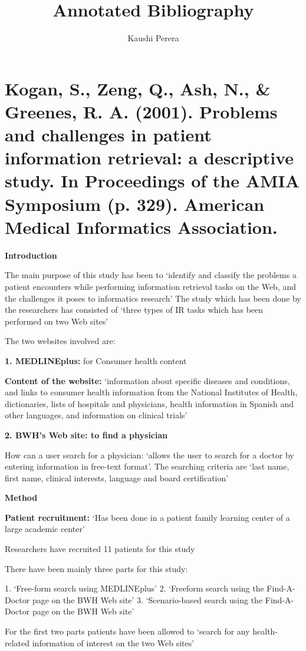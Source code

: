 \documentclass[]{article}
\title{Annotated Bibliography}
\author{Kaushi Perera}
\begin{document}
\maketitle


\section{Kogan, S., Zeng, Q., Ash, N., \& Greenes, R. A. (2001). Problems and challenges in patient information retrieval: a descriptive study. In Proceedings of the AMIA Symposium (p. 329). American Medical Informatics Association.}

\textbf{Introduction}

The main purpose of this study has been to ‘identify and classify the problems a patient encounters while performing information retrieval tasks on the Web, and the challenges it poses to informatics research’
The study which has been done by the researchers has consisted of ‘three types of IR tasks which has been performed on two Web sites’

The two websites involved are:

\textbf{1.	MEDLINEplus:} for Consumer health content

\textbf{Content of the website:} ‘information about specific diseases and conditions, and links to consumer health information from the National Institutes of Health, dictionaries, lists of hospitals and physicians, health information in Spanish and other languages, and information on clinical trials’

\textbf{2.	BWH's Web site: to find a physician}

How can a user search for a physician: ‘allows the user to search for a doctor by entering information in free-text format’. The searching criteria are ‘last name, first name, clinical interests, language and board certification’

\textbf{Method}

\textbf{Patient recruitment:} ‘Has been done in a patient family learning center of a large academic center’

Researchers have recruited 11 patients for this study

There have been mainly three parts for this study:

1.	‘Free-form search using MEDLINEplus’
2.	 ‘Freeform search using the Find-A-Doctor page on the BWH Web site’
3.	‘Scenario-based search using the Find-A-Doctor page on the BWH Web site’

For the first two parts patients have been allowed to ‘search for any health-related information of interest on the two Web sites’ 
\end{document}
